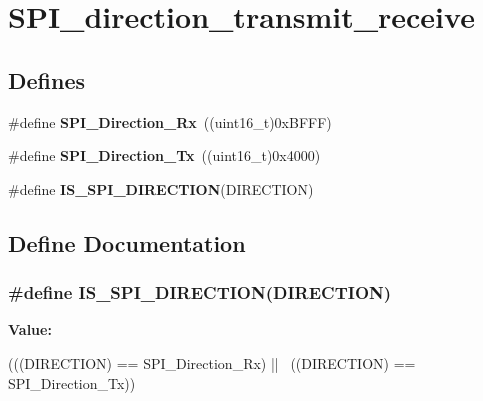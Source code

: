 \hypertarget{group__SPI__direction__transmit__receive}{
\section{SPI\_\-direction\_\-transmit\_\-receive}
\label{group__SPI__direction__transmit__receive}
}
\subsection*{Defines}
\begin{DoxyCompactItemize}
\item 
\hypertarget{group__SPI__direction__transmit__receive_ga9a59d225a8cf42eebafbec6ad95c078c}{
\#define {\bfseries SPI\_\-Direction\_\-Rx}~((uint16\_\-t)0xBFFF)}
\label{group__SPI__direction__transmit__receive_ga9a59d225a8cf42eebafbec6ad95c078c}

\item 
\hypertarget{group__SPI__direction__transmit__receive_gabd76982a7e305c13f7ad8ea1789d3c0c}{
\#define {\bfseries SPI\_\-Direction\_\-Tx}~((uint16\_\-t)0x4000)}
\label{group__SPI__direction__transmit__receive_gabd76982a7e305c13f7ad8ea1789d3c0c}

\item 
\#define {\bfseries IS\_\-SPI\_\-DIRECTION}(DIRECTION)
\end{DoxyCompactItemize}


\subsection{Define Documentation}
\hypertarget{group__SPI__direction__transmit__receive_gae96b69403c4206e347cde77b9a30e207}{
\subsubsection[{IS\_\-SPI\_\-DIRECTION}]{\setlength{\rightskip}{0pt plus 5cm}\#define IS\_\-SPI\_\-DIRECTION(DIRECTION)}}
\label{group__SPI__direction__transmit__receive_gae96b69403c4206e347cde77b9a30e207}
{\bfseries Value:}
\begin{DoxyCode}
(((DIRECTION) == SPI_Direction_Rx) || \
                                     ((DIRECTION) == SPI_Direction_Tx))
\end{DoxyCode}
